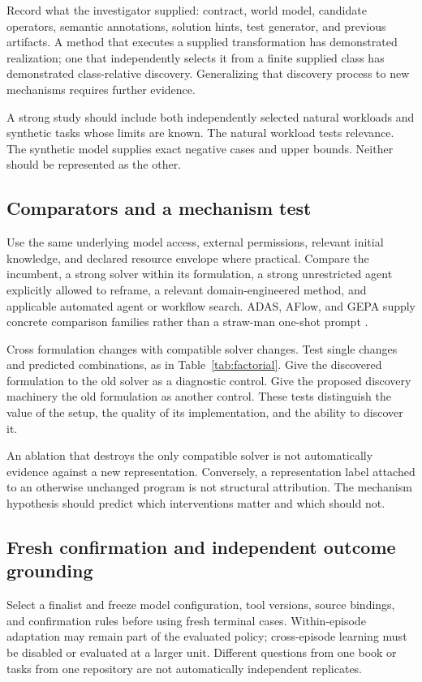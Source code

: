 \documentclass[11pt,letterpaper]{article}
\theoremstyle{remark}\newtheorem{remark}{Remark}[section]
\begin{document}
Record what the investigator supplied: contract, world model, candidate operators, semantic annotations, solution hints, test generator, and previous artifacts. A method that executes a supplied transformation has demonstrated realization; one that independently selects it from a finite supplied class has demonstrated class-relative discovery. Generalizing that discovery process to new mechanisms requires further evidence.

A strong study should include both independently selected natural workloads and synthetic tasks whose limits are known. The natural workload tests relevance. The synthetic model supplies exact negative cases and upper bounds. Neither should be represented as the other.

\subsection{Comparators and a mechanism test}
Use the same underlying model access, external permissions, relevant initial knowledge, and declared resource envelope where practical. Compare the incumbent, a strong solver within its formulation, a strong unrestricted agent explicitly allowed to reframe, a relevant domain-engineered method, and applicable automated agent or workflow search. ADAS, AFlow, and GEPA supply concrete comparison families rather than a straw-man one-shot prompt \citep{hu2024,zhang2024aflow,agrawal2025}.

Cross formulation changes with compatible solver changes. Test single changes and predicted combinations, as in Table~\ref{tab:factorial}. Give the discovered formulation to the old solver as a diagnostic control. Give the proposed discovery machinery the old formulation as another control. These tests distinguish the value of the setup, the quality of its implementation, and the ability to discover it.

An ablation that destroys the only compatible solver is not automatically evidence against a new representation. Conversely, a representation label attached to an otherwise unchanged program is not structural attribution. The mechanism hypothesis should predict which interventions matter and which should not.

\subsection{Fresh confirmation and independent outcome grounding}
Select a finalist and freeze model configuration, tool versions, source bindings, and confirmation rules before using fresh terminal cases. Within-episode adaptation may remain part of the evaluated policy; cross-episode learning must be disabled or evaluated at a larger unit. Different questions from one book or tasks from one repository are not automatically independent replicates.
\end{document}
